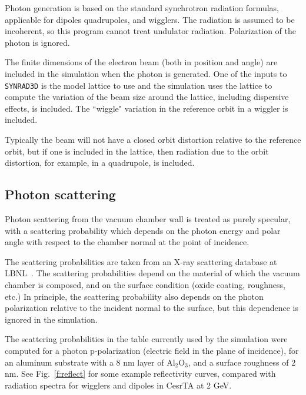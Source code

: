 \documentclass[11pt]{article}
\newcommand{\srthree}{\texttt{SYNRAD3D}\xspace}
\begin{document}
Photon generation is based on the standard synchrotron radiation
formulas, applicable for dipoles quadrupoles, and wigglers. The
radiation is assumed to be incoherent, so this program cannot treat
undulator radiation. Polarization of the photon is ignored.

The finite dimensions of the electron beam (both in position and
angle) are included in the simulation when the photon is
generated. One of the inputs to \srthree is the model lattice
to use and the simulation uses the lattice to compute the
variation of the beam size around the lattice, including dispersive
effects, is included. The ``wiggle" variation in the reference orbit
in a wiggler is included.

Typically the beam will not have a closed orbit distortion relative to
the reference orbit, but if one is included in the lattice, then
radiation due to the orbit distortion, for example, in a quadrupole,
is included.  

\subsection{Photon scattering} 

Photon scattering from the vacuum chamber wall is treated as purely
specular, with a scattering probability which depends on the photon
energy and polar angle with respect to the chamber normal at the point
of incidence.

The scattering probabilities are taken from an X-ray scattering
database at LBNL~\cite{b.henke}. The scattering probabilities depend on
the material of which the vacuum chamber is composed, and on the
surface condition (oxide coating, roughness, etc.) In principle, the
scattering probability also depends on the photon polarization
relative to the incident normal to the surface, but this dependence is
ignored in the simulation.

The scattering probabilities in the table currently used by the
simulation were computed for a photon p-polarization (electric field
in the plane of incidence), for an aluminum substrate with a 8 nm
layer of Al$_2$O$_3$, and a surface roughness of 2 nm. See
Fig.~\ref{f:reflect} for some example reflectivity curves, compared with
radiation spectra for wigglers and dipoles in CesrTA at 2 GeV.
\end{document}

